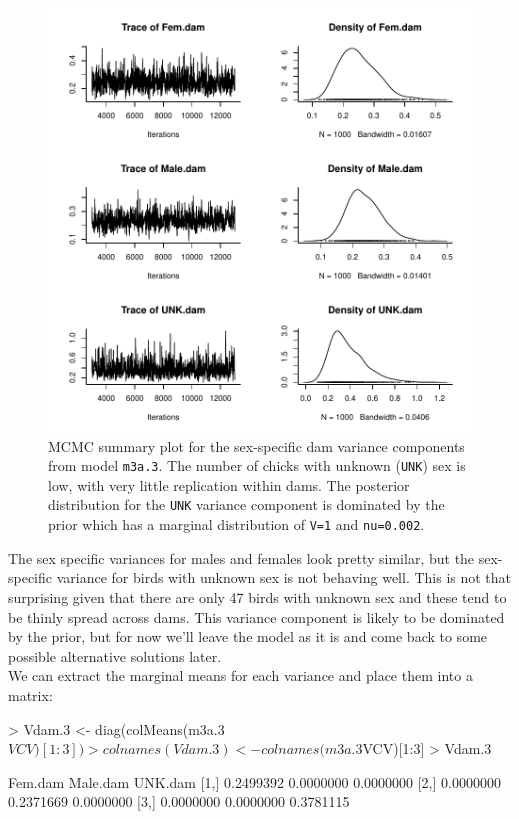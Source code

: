 \documentclass{article}
\begin{document}
\begin{figure}[!h]
\begin{center}
\includegraphics{Lecture3-018}
\end{center}
\caption{MCMC summary plot for the sex-specific dam variance components from model \texttt{m3a.3}. The number of chicks with unknown (\texttt{UNK}) sex is low, with very little replication within dams. The posterior distribution for the \texttt{UNK} variance component is dominated by the prior which has a marginal distribution of \texttt{V=1} and \texttt{nu=0.002}.}
\label{BTidh-fig}
\end{figure}

The sex specific variances for males and females look pretty similar, but the sex-specific variance for birds with unknown sex is not behaving well. This is not that surprising given that there are only 47 birds with unknown sex and these tend to be thinly spread across dams. This variance component is likely to be dominated by the prior, but for now we'll leave the model as it is and come back to some possible alternative solutions later.\\

We can extract the marginal means for each variance and place them into a matrix:

\begin{Schunk}
\begin{Sinput}
> Vdam.3 <- diag(colMeans(m3a.3$VCV)[1:3])
> colnames(Vdam.3) <- colnames(m3a.3$VCV)[1:3]
> Vdam.3
\end{Sinput}
\begin{Soutput}
       Fem.dam  Male.dam   UNK.dam
[1,] 0.2499392 0.0000000 0.0000000
[2,] 0.0000000 0.2371669 0.0000000
[3,] 0.0000000 0.0000000 0.3781115
\end{Soutput}
\end{Schunk}
\end{document}
